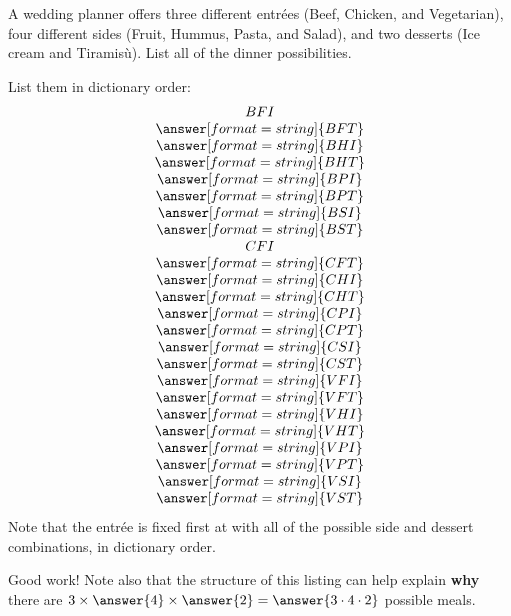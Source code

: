 \documentclass[nooutcomes]{ximera}
\begin{document}
\begin{problem}
A wedding planner offers three different entr\'ees (Beef, Chicken, and Vegetarian), four different sides (Fruit, Hummus, Pasta, and Salad), and two desserts (Ice cream and Tiramis\`u).  List all of the dinner possibilities.  

\begin{solution}
List them in dictionary order: 
\[
\begin{array}{c}
BFI \\
\answer[format=string]{BFT} \\
\answer[format=string]{BHI} \\
\answer[format=string]{BHT} \\
\answer[format=string]{BPI} \\
\answer[format=string]{BPT} \\
\answer[format=string]{BSI} \\
\answer[format=string]{BST} \\
CFI \\
\answer[format=string]{CFT} \\
\answer[format=string]{CHI} \\
\answer[format=string]{CHT} \\
\answer[format=string]{CPI} \\
\answer[format=string]{CPT} \\
\answer[format=string]{CSI} \\
\answer[format=string]{CST} \\
\answer[format=string]{VFI} \\
\answer[format=string]{VFT} \\
\answer[format=string]{VHI} \\
\answer[format=string]{VHT} \\
\answer[format=string]{VPI} \\
\answer[format=string]{VPT} \\
\answer[format=string]{VSI} \\
\answer[format=string]{VST} 
\end{array}
\]
Note that the entr\'ee is fixed first at  with all of the possible side and dessert combinations, in dictionary order.  

\begin{problem}
Good work!  Note also that the structure of this listing can help explain \textbf{why} there are 
$3\times\answer{4}\times\answer{2}=\answer{3\cdot 4\cdot 2}$ possible meals.  


\end{problem}
\end{solution}
\end{problem}
\end{document}
